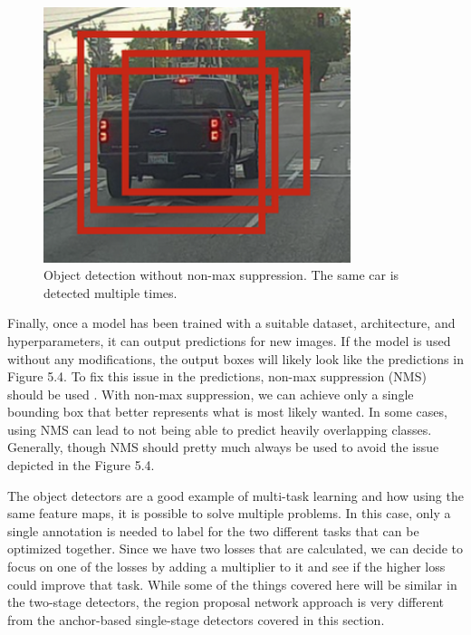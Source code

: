 \begin{figure}[h!]
    \centering
    \includegraphics[width=0.8\textwidth]{imgs/nms.png}
    \caption{Object detection without non-max suppression. The same car is detected multiple times.}
\end{figure}

Finally, once a model has been trained with a suitable dataset, architecture, and hyperparameters, it can output predictions for new images.
If the model is used without any modifications, the output boxes will likely look like the predictions in Figure 5.4.
To fix this issue in the predictions, non-max suppression (NMS) should be used \citep{nms}.
With non-max suppression, we can achieve only a single bounding box that better represents what is most likely wanted.
In some cases, using NMS can lead to not being able to predict heavily overlapping classes.
Generally, though NMS should pretty much always be used to avoid the issue depicted in the Figure 5.4.

The object detectors are a good example of multi-task learning and how using the same feature maps, it is possible to solve multiple problems.
In this case, only a single annotation is needed to label for the two different tasks that can be optimized together.
Since we have two losses that are calculated, we can decide to focus on one of the losses by adding a multiplier to it and see if the higher loss could improve that task.
While some of the things covered here will be similar in the two-stage detectors, the region proposal network approach is very different from the anchor-based single-stage detectors covered in this section.
